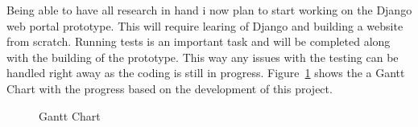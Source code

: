 \documentclass[../main.tex]{subfiles}
\begin{document}
\raggedright

Being able to have all research in hand i now plan to start working on the Django web portal prototype. This will require learing of Django and building a website from scratch. Running tests is an important task and will be completed along with the building of the prototype. This way any issues with the testing can be handled right away as the coding is still in progress. 
Figure~\ref{fig:ganttchart} shows the a Gantt Chart with the progress based on the development of this project.

	\begin{figure}[h!]
        \caption{\label{fig:ganttchart} Gantt Chart}
      \end{figure}
\end{document}
